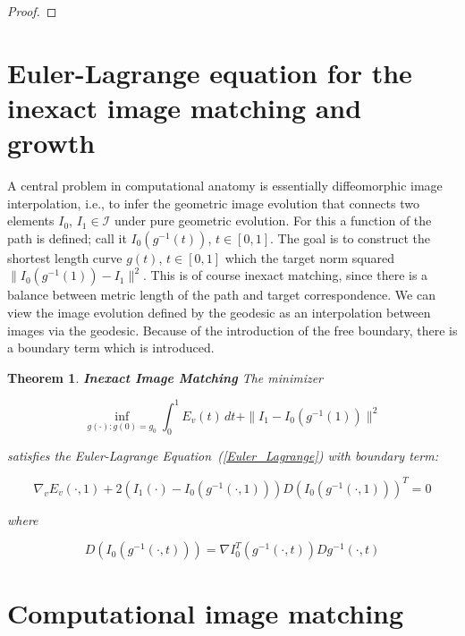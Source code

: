 \documentclass[final, paper=letter,5p,times,twocolumn]{elsarticle}
\newcommand{\CA}{computational anatomy}
\newtheorem{theorem}{Theorem} %
\theoremstyle{definition}
\begin{document}
{\begin{proof}
    
\end{proof}

\section{Euler-Lagrange equation for the inexact image matching and growth}

A central problem in \CA{} is essentially diffeomorphic image interpolation, i.e., to infer the geometric image evolution that connects two elements $I_{0}$, $I_{1} \in \mathcal{I}$ under pure geometric evolution. For this a function of the path is defined; call it $I_{0}(g^{-1}(t))$, $t \in [0, 1]$. The goal is to construct the shortest length curve $g(t)$, $t \in [0, 1]$ which  the target norm squared $\| I_{0} (g^{-1}(1)) - I_{1} \|^{2}$. This is of course inexact matching, since there is a balance between metric length of the path and target correspondence. We can view the image evolution defined by the geodesic as an interpolation between images via the geodesic. Because of the introduction of the free boundary, there is a boundary term which is introduced.

\begin{theorem}
  {\bf Inexact Image Matching} The minimizer

  $$
\underset{g(\cdot):  g(0) = g_{0}}{\inf} \int_{0}^{1} E_{v}(t) \, dt + \| I_{1} - I_{0}(g^{-1}(1))\|^{2}
$$

satisfies the Euler-Lagrange Equation~(\ref{Euler_Lagrange}) with boundary term:

$$
\nabla_{v}E_{v}(\cdot, 1) + 2(I_{1}(\cdot) - I_{0}(g^{-1}(\cdot, 1)))D(I_{0}(g^{-1}(\cdot, 1)))^{T} = 0
$$

where

$$
D(I_{0}(g^{-1}(\cdot,t))) = \nabla I_{0}^{T}(g^{-1}(\cdot, t))Dg^{-1}(\cdot, t)
$$
\end{theorem}






\section{Computational image matching}

}
\end{document}
